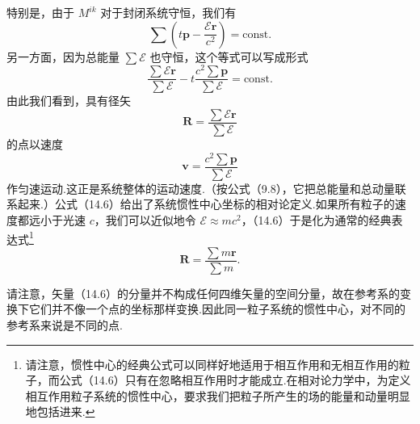 特别是，由于 $M^{ik}$ 对于封闭系统守恒，我们有
\begin{equation*}
  \sum\left(t\boldsymbol{p}-\frac{\mathcal{E}\boldsymbol{r}}{c^2}\right)
  =\mathrm{const}.
\end{equation*}
另一方面，因为总能量 $\sum\mathcal{E}$ 也守恒，这个等式可以写成形式
\begin{equation*}
  \frac{\sum\mathcal{E}\boldsymbol{r}}{\sum\mathcal{E}}
  -t\frac{c^2\sum\boldsymbol{p}}{\sum\mathcal{E}}=\mathrm{const}.
\end{equation*}
由此我们看到，具有径矢
\begin{equation}
  \boldsymbol{R}=\frac{\sum\mathcal{E}\boldsymbol{r}}{\sum\mathcal{E}}
\end{equation}
的点以速度
\begin{equation}
  \boldsymbol{v}=\frac{c^2\sum\boldsymbol{p}}{\sum\mathcal{E}}
\end{equation}
作匀速运动.这正是系统整体的运动速度.（按公式（9.8），它把总能量和总动量联系起来.）公式（14.6）给出了系统惯性中心坐标的相对论定义.如果所有粒子的速度都远小于光速 $c$，我们可以近似地令 $\mathcal{E}\approx mc^2$，（14.6）于是化为通常的经典表达式\footnote{请注意，惯性中心的经典公式可以同样好地适用于相互作用和无相互作用的粒子，而公式（14.6）只有在忽略相互作用时才能成立.在相对论力学中，为定义相互作用粒子系统的惯性中心，要求我们把粒子所产生的场的能量和动量明显地包括进来.}
\begin{equation*}
  \boldsymbol{R}=\frac{\sum m\boldsymbol{r}}{\sum m}.
\end{equation*}

请注意，矢量（14.6）的分量并不构成任何四维矢量的空间分量，故在参考系的变换下它们并不像一个点的坐标那样变换.因此同一粒子系统的惯性中心，对不同的参考系来说是不同的点.

